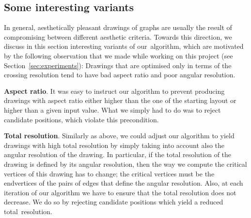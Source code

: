 \documentclass[runningheads]{llncs}
\newcommand{\myparagraph}[1]{\smallskip\noindent\textbf{#1}.}
\begin{document}
\subsection{Some interesting variants}
\label{ssec:variants}

In general, aesthetically pleasant drawings of graphs are usually the result of compromising between different aesthetic criteria. Towards this direction, we discuss in this section interesting variants of our~algorithm, which are motivated by the following observation that we made while working on this project (see Section~\ref{sec:experiments}): Drawings that are optimised only in terms of the crossing resolution tend to have bad aspect ratio
and poor angular resolution.

\myparagraph{Aspect ratio}
%
It was easy to instruct our algorithm to prevent producing drawings with aspect ratio either higher than the one of the starting layout or higher than a given input value. What we simply had to do was to reject candidate positions, which violate this precondition.

\myparagraph{Total resolution}
%
Similarly as above, we could adjust our algorithm to yield drawings with high total resolution by simply taking into account also the angular resolution of the drawing. In particular, if the total resolution of the drawing is defined by its angular resolution, then the way we compute the critical vertices of this drawing has to change; the critical vertices must be the endvertices of the pairs of edges that define the angular resolution. Also, at each iteration of our algorithm we have to ensure that the total resolution does not decrease. We do so by rejecting candidate positions which yield a reduced total~resolution.
\end{document}
